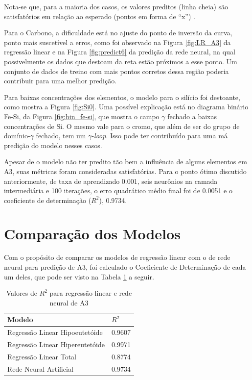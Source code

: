 \documentclass[brazil,tf,epusp]{usp}  %
\begin{document}
Nota-se que, para a maioria dos casos, os valores preditos (linha cheia) são satisfatórios em relação ao esperado (pontos em forma de ``x'') .

Para o Carbono, a dificuldade está no ajuste do ponto de inversão da curva, ponto mais suscetível a erros, como foi observado na Figura \ref{fig:LR_A3} da regressão linear e na Figura \ref{fig:predict6} da predição da rede neural, na qual possivelmente os dados que destoam da reta estão próximos a esse ponto. Um conjunto de dados de treino com mais pontos corretos dessa região poderia contribuir para uma melhor predição.

Para baixas concentrações dos elementos, o modelo para o silício foi destoante, como mostra a Figura \ref{fig:Si0}. Uma possível explicação está no diagrama binário Fe-Si, da Figura \ref{fig:bin_fe-si}, que mostra o campo $\gamma$ fechado a baixas concentrações de Si. O mesmo vale para o cromo, que além de ser do grupo de domínio-$\gamma$ fechado, tem um $\gamma$-\textit{loop}. Isso pode ter contribuído para uma má predição do modelo nesses casos.

Apesar de o modelo não ter predito tão bem a influência de alguns elementos em A3, suas métricas foram consideradas satisfatórias. Para o ponto ótimo discutido anteriormente, de taxa de aprendizado 0.001, seis neurônios na camada intermediária e 100 iterações, o erro quadrático médio final foi de 0.0051 e o coeficiente de determinação ($R^{2}$), 0.9734.

\section{Comparação dos Modelos}

Com o propósito de comparar os modelos de regressão linear com o de rede neural para predição de A3, foi calculado o Coeficiente de Determinação de cada um deles, que pode ser visto na Tabela \ref{tab:r2_comparacao} a seguir.

\begin{table}
  \caption{Valores de $R^{2}$ para regressão linear e rede neural de A3}

  \begin{tabular}{ll}
  \hline
  Modelo                          & $R^{2}$ \\
  \hline
  Regressão Linear Hipoeutetóide  & 0.9607  \\
  Regressão Linear Hipereutetóide & 0.9971  \\
  Regressão Linear Total          & 0.8774  \\
  Rede Neural Artificial          & 0.9734  \\
  \hline
  \end{tabular}

  \label{tab:r2_comparacao}
\end{table}
\end{document}
